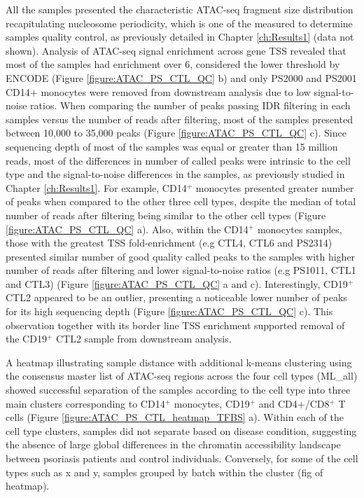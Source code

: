 All the samples presented the characteristic ATAC-seq fragment size distribution recapitulating nucleosome periodicity, which is one of the measured to determine samples quality control, as previously detailed in Chapter \ref{ch:Results1} (data not shown). Analysis of ATAC-seq signal enrichment across gene TSS revealed that most of the samples had enrichment over 6, considered the lower threshold by ENCODE (Figure \ref{figure:ATAC_PS_CTL_QC} b) and only PS2000 and PS2001 CD14$+$ monocytes were removed from downstream analysis due to low signal-to-noise ratios. When comparing the number of peaks passing IDR filtering in each samples versus the number of reads after filtering, most of the samples presented between 10,000 to 35,000 peaks (Figure \ref{figure:ATAC_PS_CTL_QC} c). Since sequencing depth of most of the samples was equal or greater than 15 million reads, most of the differences in number of called peaks were intrinsic to the cell type and the signal-to-noise differences in the samples, as previously studied in Chapter \ref{ch:Results1}. For example, CD14$^+$ monocytes presented greater number of peaks when compared to the other three cell types, despite the median of total number of reads after filtering being similar to the other cell types (Figure \ref{figure:ATAC_PS_CTL_QC} a). Also, within the CD14$^+$ monocytes samples, those with the greatest TSS fold-enrichment (e.g CTL4, CTL6 and PS2314) presented similar number of good quality called peaks to the samples with higher number of reads after filtering and lower signal-to-noise ratios (e.g  PS1011, CTL1 and CTL3) (Figure \ref{figure:ATAC_PS_CTL_QC} a and c). Interestingly, CD19$^+$ CTL2 appeared to be an outlier, presenting a noticeable lower number of peaks for its high sequencing depth (Figure \ref{figure:ATAC_PS_CTL_QC} c). This observation together with its border line TSS enrichment supported removal of the CD19$^+$ CTL2 sample from downstream analysis.

A heatmap illustrating sample distance with additional k-means clustering using the consensus master list of ATAC-seq regions across the four cell types (ML\_all) showed successful separation of the samples according to the cell type into three main clusters corresponding to CD14$^+$ monocytes, CD19$^+$ and CD4$+$/CD8$^+$ T cells (Figure \ref{figure:ATAC_PS_CTL_heatmap_TFBS} a). Within each of the cell type clusters, samples did not separate based on disease condition, suggesting the absence of large global differences in the chromatin accessibility landscape between psoriasis patients and control individuals. Conversely, for some of the cell types such as x and y, samples grouped by batch within the cluster (fig of heatmap).

